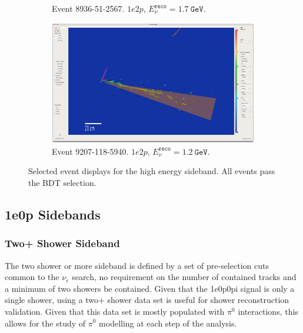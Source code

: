 \begin{figure}[H]
\begin{center}
\begin{subfigure}{0.45\textwidth}
    \caption{Event 8936-51-2567. $1e2p$, $E_\nu^{\texttt{reco}} = 1.7~\texttt{GeV}$.}
    \end{subfigure}
    \begin{subfigure}{0.45\textwidth}
    \includegraphics[width=1.00\textwidth]{Sidebands/Figures/1eNp/HighEnergy/EVD/evt-9207-118-5940_reco2.png}
    \caption{Event 9207-118-5940. $1e2p$, $E_\nu^{\texttt{reco}} = 1.2~\texttt{GeV}$.}
    \end{subfigure}
    \caption{\label{fig:sb:1eNp:he:evd} Selected event displays for the \npsel high energy sideband. All events pass the BDT selection.}
    \end{center}
\end{figure}

\subsection{1e0p Sidebands}
\label{sec:sideband:1e0p}

\subsubsection{Two+ Shower Sideband}
\label{sec:sideband:1e0p:2pshr}

The two shower or more sideband is defined by a set of pre-selection cuts common to the $\nu_e$ search, no requirement on the number of contained tracks and a minimum of two showers be contained. Given that the 1e0p0pi signal is only a single shower, using a two+ shower data set is useful for shower reconstruction validation. Given that this data set is mostly populated with $\pi^0$ interactions, this allows for the study of $\pi^0$ modelling at each step of the analysis.

